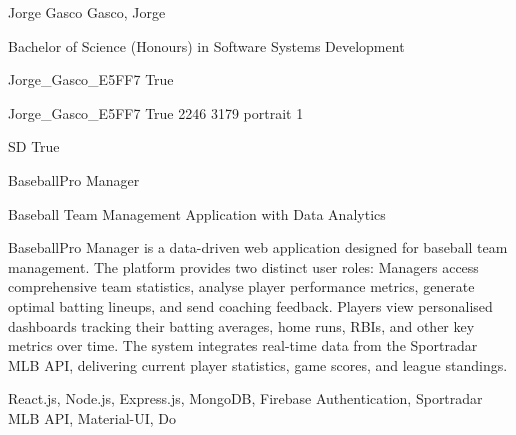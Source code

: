 \documentclass[twoside]{report}
\begin{document}
\begingroup{}\relax



\def\Key{Jorge_Gasco_E5FF7}

{Jorge Gasco}
{Gasco, Jorge}

{Bachelor of Science (Honours) in Software Systems Development}

{Jorge_Gasco_E5FF7}
{True}

{Jorge_Gasco_E5FF7}
{True}
{2246}
{3179}
{portrait}
{1}

{SD}
{True}

{BaseballPro Manager}

{Baseball Team Management Application with Data Analytics}

{BaseballPro Manager is a data-driven web application designed for baseball team management. The platform provides two distinct user roles: Managers access comprehensive team statistics, analyse player performance metrics, generate optimal batting lineups, and send coaching feedback. Players view personalised dashboards tracking their batting averages, home runs, RBIs, and other key metrics over time. The system integrates real-time data from the Sportradar MLB API, delivering current player statistics, game scores, and league standings.}

{React.js, Node.js, Express.js, MongoDB, Firebase Authentication, Sportradar MLB API, Material-UI, Do}
\end{document}
